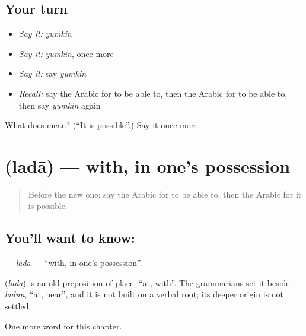 \subsection*{Your turn}
\begin{itemize}
\raggedright
  \item \emph{Say it:} \emph{yumkin}
  \item \emph{Say it:} \emph{yumkin}, once more
  \item \emph{Say it:} say \emph{yumkin}
  \item \emph{Recall:} say the Arabic for to be able to, then the Arabic for to be able to, then say \emph{yumkin} again
\end{itemize}

\begin{tcolorbox}[breakable,colback=teal!4,colframe=teal!35!black,title={Before you move on}]
What does  mean? (\textquotedblleft{}It is possible\textquotedblright{}.) Say it once more.
\end{tcolorbox}
\section[\texorpdfstring{\ar{لدى} (ladā)}{لدى (ladā)}]{ (ladā) — with, in one's possession}

\label{lesson:AR-C108-lada}



\begin{quote}
Before the new one: say the Arabic for to be able to, then the Arabic for it is possible.
\end{quote}

\subsection*{You'll want to know: }
\textbf{} — \emph{ladā} — \textquotedblleft{}with, in one's possession\textquotedblright{}.

\begin{cousinweb}
\textbf{} (\emph{ladā}) is an old preposition of place, \textquotedblleft{}at, with\textquotedblright{}. The grammarians set it beside \emph{ladun}, \textquotedblleft{}at, near\textquotedblright{}, and it is not built on a verbal root; its deeper origin is not settled.
\end{cousinweb}

\begin{grammarlens}[title={What you've built}]
One more word for this chapter.
\end{grammarlens}

